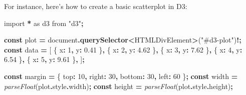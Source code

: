 \documentclass[
  openany]{book}
\newenvironment{Shaded}{\begin{snugshade}}{\end{snugshade}}
\newcommand{\AttributeTok}[1]{\textcolor[rgb]{0.13,0.29,0.53}{#1}}
\newcommand{\BuiltInTok}[1]{#1}
\newcommand{\DataTypeTok}[1]{\textcolor[rgb]{0.13,0.29,0.53}{#1}}
\newcommand{\DecValTok}[1]{\textcolor[rgb]{0.00,0.00,0.81}{#1}}
\newcommand{\FloatTok}[1]{\textcolor[rgb]{0.00,0.00,0.81}{#1}}
\newcommand{\FunctionTok}[1]{\textcolor[rgb]{0.13,0.29,0.53}{\textbf{#1}}}
\newcommand{\ImportTok}[1]{#1}
\newcommand{\KeywordTok}[1]{\textcolor[rgb]{0.13,0.29,0.53}{\textbf{#1}}}
\newcommand{\NormalTok}[1]{#1}
\newcommand{\OperatorTok}[1]{\textcolor[rgb]{0.81,0.36,0.00}{\textbf{#1}}}
\newcommand{\PreprocessorTok}[1]{\textcolor[rgb]{0.56,0.35,0.01}{\textit{#1}}}
\newcommand{\StringTok}[1]{\textcolor[rgb]{0.31,0.60,0.02}{#1}}
\theoremstyle{definition}
\theoremstyle{definition}
\theoremstyle{definition}
\theoremstyle{definition}
\theoremstyle{remark}
\begin{document}
For instance, here's how to create a basic scatterplot in D3:

\begin{Shaded}
\begin{Highlighting}[]
\ImportTok{import} \OperatorTok{*} \ImportTok{as}\NormalTok{ d3 }\ImportTok{from} \StringTok{"d3"}\OperatorTok{;}

\KeywordTok{const}\NormalTok{ plot }\OperatorTok{=} \BuiltInTok{document}\OperatorTok{.}\FunctionTok{querySelector}\OperatorTok{\textless{}}\BuiltInTok{HTMLDivElement}\OperatorTok{\textgreater{}}\NormalTok{(}\StringTok{"\#d3{-}plot"}\NormalTok{)}\OperatorTok{!;}
\KeywordTok{const}\NormalTok{ data }\OperatorTok{=}\NormalTok{ [}
\NormalTok{  \{ }\DataTypeTok{x}\OperatorTok{:} \DecValTok{1}\OperatorTok{,} \DataTypeTok{y}\OperatorTok{:} \FloatTok{0.41}\NormalTok{ \}}\OperatorTok{,}
\NormalTok{  \{ }\DataTypeTok{x}\OperatorTok{:} \DecValTok{2}\OperatorTok{,} \DataTypeTok{y}\OperatorTok{:} \FloatTok{4.62}\NormalTok{ \}}\OperatorTok{,}
\NormalTok{  \{ }\DataTypeTok{x}\OperatorTok{:} \DecValTok{3}\OperatorTok{,} \DataTypeTok{y}\OperatorTok{:} \FloatTok{7.62}\NormalTok{ \}}\OperatorTok{,}
\NormalTok{  \{ }\DataTypeTok{x}\OperatorTok{:} \DecValTok{4}\OperatorTok{,} \DataTypeTok{y}\OperatorTok{:} \FloatTok{6.54}\NormalTok{ \}}\OperatorTok{,}
\NormalTok{  \{ }\DataTypeTok{x}\OperatorTok{:} \DecValTok{5}\OperatorTok{,} \DataTypeTok{y}\OperatorTok{:} \FloatTok{9.61}\NormalTok{ \}}\OperatorTok{,}
\NormalTok{]}\OperatorTok{;}

\KeywordTok{const}\NormalTok{ margin }\OperatorTok{=}\NormalTok{ \{ }\DataTypeTok{top}\OperatorTok{:} \DecValTok{10}\OperatorTok{,} \DataTypeTok{right}\OperatorTok{:} \DecValTok{30}\OperatorTok{,} \DataTypeTok{bottom}\OperatorTok{:} \DecValTok{30}\OperatorTok{,} \DataTypeTok{left}\OperatorTok{:} \DecValTok{60}\NormalTok{ \}}\OperatorTok{;}
\KeywordTok{const}\NormalTok{ width }\OperatorTok{=} \PreprocessorTok{parseFloat}\NormalTok{(plot}\OperatorTok{.}\AttributeTok{style}\OperatorTok{.}\AttributeTok{width}\NormalTok{)}\OperatorTok{;}
\KeywordTok{const}\NormalTok{ height }\OperatorTok{=} \PreprocessorTok{parseFloat}\NormalTok{(plot}\OperatorTok{.}\AttributeTok{style}\OperatorTok{.}\AttributeTok{height}\NormalTok{)}\OperatorTok{;}


\end{Highlighting}
\end{Shaded}
\end{document}
